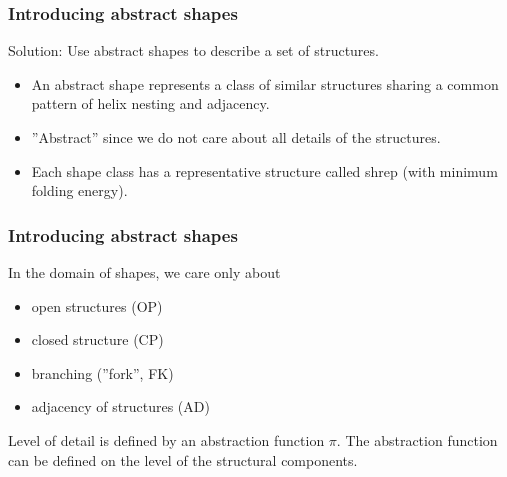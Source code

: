 \documentclass[ignorenonframetext,10pt]{beamer}
\begin{document}
\begin{frame}
\frametitle{Introducing abstract shapes}
    Solution: Use abstract shapes to describe a set of structures.
    \begin{itemize} 
    \item An abstract shape represents a class of similar structures sharing a
    common pattern of helix nesting and adjacency.
    \item ''Abstract'' since we do not care about all details of the structures.
    \item Each shape class has a representative structure called shrep (with minimum folding energy).
    \end{itemize}
\end{frame}

\begin{frame}
\frametitle{Introducing abstract shapes}
    In the domain of shapes, we care only about
    \begin{itemize} 
    \item open structures (OP)
    \item closed structure (CP)
    \item branching (''fork'', FK)
    \item adjacency of structures (AD)
    \end{itemize}
    Level of detail is defined by an abstraction function $\pi$.
    The abstraction function can be defined on the level of the structural components.
\end{frame}

\end{document}
